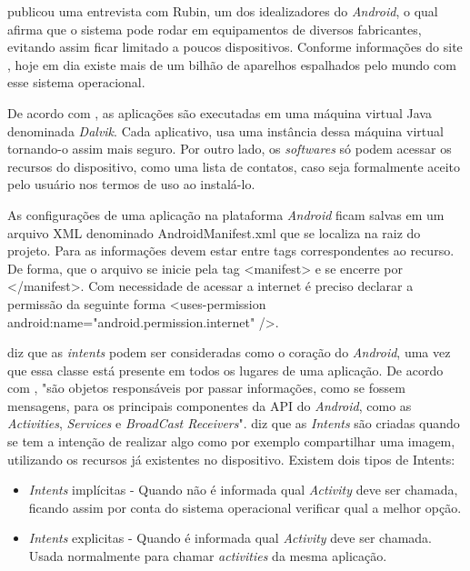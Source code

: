 	\par {} publicou uma entrevista com Rubin, um dos
idealizadores do \textit{Android}, o qual afirma que o sistema pode rodar em
equipamentos de diversos fabricantes, evitando assim ficar limitado a poucos
dispositivos. Conforme informações do site , hoje em dia
existe mais de um bilhão de aparelhos espalhados pelo mundo com esse sistema
operacional.

	\par De acordo com , as aplicações são executadas em
uma máquina virtual Java denominada \textit{Dalvik}. Cada aplicativo, usa uma
instância dessa máquina virtual tornando-o assim mais seguro. Por outro lado, os
\textit{softwares} só podem acessar os recursos do dispositivo, como uma
lista de contatos, caso seja formalmente aceito pelo usuário nos termos de uso
ao instalá-lo.

	\par As configurações de uma aplicação na plataforma \textit{Android} ficam
salvas em um arquivo XML denominado AndroidManifest.xml que se localiza na raiz
do projeto. Para  as informações devem estar entre tags
correspondentes ao recurso. De forma, que o arquivo se inicie pela tag
<manifest> e se encerre por </manifest>. Com necessidade de acessar a internet
é preciso declarar a permissão da seguinte forma <uses-permission
android:name="android.permission.internet" />.

	\par {} diz que as \textit{intents} podem ser
consideradas como o coração do \textit{Android}, uma vez que essa classe está
presente em todos os lugares de uma aplicação. De acordo com
, "são objetos responsáveis por passar informações,
como se fossem mensagens, para os principais componentes da API do
\textit{Android}, como as \textit{Activities}, \textit{Services} e
\textit{BroadCast Receivers}".  diz que as
\textit{Intents} são criadas quando se tem a intenção de realizar algo como por
exemplo compartilhar uma imagem, utilizando os recursos já existentes no
dispositivo. Existem dois tipos de Intents:
	
	\begin{itemize}
	  
	  \item \textit{Intents} implícitas - Quando não é informada qual
	  \textit{Activity} deve ser chamada, ficando assim por conta do sistema
	  operacional verificar qual a melhor opção.
	  
	  \item \textit{Intents} explicitas - Quando é informada qual
	  \textit{Activity} deve ser chamada. Usada normalmente para chamar
	  \textit{activities} da mesma aplicação.
	  
	\end{itemize}
	

